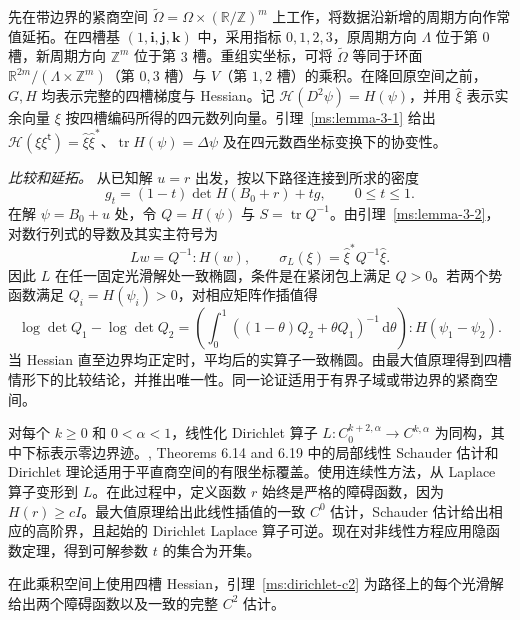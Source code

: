 先在带边界的紧商空间 $\widetilde\Omega=\Omega\times(\mathbb R/\mathbb Z)^m$ 上工作，将数据沿新增的周期方向作常值延拓。在四槽基 $(1,\mathbf i,\mathbf j,\mathbf k)$ 中，采用指标 $0,1,2,3$，原周期方向 $\Lambda$ 位于第 $0$ 槽，新周期方向 $\mathbb Z^m$ 位于第 $3$ 槽。重组实坐标，可将 $\widetilde\Omega$ 等同于环面 $\mathbb R^{2m}/(\Lambda\times\mathbb Z^m)$（第 $0,3$ 槽）与 $V$（第 $1,2$ 槽）的乘积。在降回原空间之前，$G,H$ 均表示完整的四槽梯度与 Hessian。记 $\mathcal H(D^2\psi)=H(\psi)$，并用 $\widehat\xi$ 表示实余向量 $\xi$ 按四槽编码所得的四元数列向量。引理~\ref{ms:lemma-3-1} 给出 $\mathcal H(\xi\xi^{\mathsf t})=\widehat\xi\widehat\xi^*$、$\operatorname{tr}H(\psi)=\Delta\psi$ 及在四元数酉坐标变换下的协变性。

\emph{比较和延拓。} 从已知解 $u=r$ 出发，按以下路径连接到所求的密度
\[
 g_t=(1-t)\det H(B_0+r)+tg,\qquad 0\le t\le1.
\]
在解 $\psi=B_0+u$ 处，令 $Q=H(\psi)$ 与 $S=\operatorname{tr}Q^{-1}$。由引理~\ref{ms:lemma-3-2}，对数行列式的导数及其实主符号为
\[
 Lw=Q^{-1}:H(w),\qquad \sigma_L(\xi)=\widehat\xi^*Q^{-1}\widehat\xi .
\]
因此 $L$ 在任一固定光滑解处一致椭圆，条件是在紧闭包上满足 $Q>0$。若两个势函数满足 $Q_i=H(\psi_i)>0$，对相应矩阵作插值得
\[
 \log\det Q_1-\log\det Q_2=
 \left(\int_0^1((1-\theta)Q_2+\theta Q_1)^{-1}\,\mathrm d\theta\right):H(\psi_1-\psi_2).
\]
当 Hessian 直至边界均正定时，平均后的实算子一致椭圆。由最大值原理得到四槽情形下的比较结论，并推出唯一性。同一论证适用于有界子域或带边界的紧商空间。

对每个 $k\ge0$ 和 $0<\alpha<1$，线性化 Dirichlet 算子 $L:C_0^{k+2,\alpha}\to C^{k,\alpha}$ 为同构，其中下标表示零边界迹。\cite{r-31}, Theorems 6.14 and 6.19 中的局部线性 Schauder 估计和 Dirichlet 理论适用于平直商空间的有限坐标覆盖。使用连续性方法，从 Laplace 算子变形到 $L$。在此过程中，定义函数 $r$ 始终是严格的障碍函数，因为 $H(r)\ge cI$。最大值原理给出此线性插值的一致 $C^0$ 估计，Schauder 估计给出相应的高阶界，且起始的 Dirichlet Laplace 算子可逆。现在对非线性方程应用隐函数定理，得到可解参数 $t$ 的集合为开集。

在此乘积空间上使用四槽 Hessian，引理~\ref{ms:dirichlet-c2} 为路径上的每个光滑解给出两个障碍函数以及一致的完整 $C^2$ 估计。

